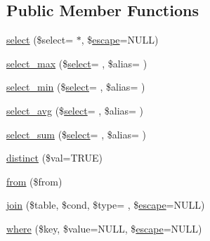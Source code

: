 \subsection*{Public Member Functions}
\begin{DoxyCompactItemize}
\item 
\hyperlink{class_c_i___d_b__query__builder_ac6194faecb10a2731d6e6016f1714531}{select} (\$select= \textquotesingle{}$\ast$\textquotesingle{}, \$\hyperlink{class_c_i___d_b__driver_ac8f37ca5703d4558c732e692194f8cd6}{escape}=N\+U\+L\+L)
\item 
\hyperlink{class_c_i___d_b__query__builder_a3283a75881bf34d98cc13aa5a187c8ac}{select\+\_\+max} (\$\hyperlink{class_c_i___d_b__query__builder_ac6194faecb10a2731d6e6016f1714531}{select}= \textquotesingle{}\textquotesingle{}, \$alias= \textquotesingle{}\textquotesingle{})
\item 
\hyperlink{class_c_i___d_b__query__builder_a460e37c355e9531b238b7c34d5979164}{select\+\_\+min} (\$\hyperlink{class_c_i___d_b__query__builder_ac6194faecb10a2731d6e6016f1714531}{select}= \textquotesingle{}\textquotesingle{}, \$alias= \textquotesingle{}\textquotesingle{})
\item 
\hyperlink{class_c_i___d_b__query__builder_a7c1b8ed90462898bd0d4e95ac3ba1539}{select\+\_\+avg} (\$\hyperlink{class_c_i___d_b__query__builder_ac6194faecb10a2731d6e6016f1714531}{select}= \textquotesingle{}\textquotesingle{}, \$alias= \textquotesingle{}\textquotesingle{})
\item 
\hyperlink{class_c_i___d_b__query__builder_aeb58275ab60ed426ce60ead616477e82}{select\+\_\+sum} (\$\hyperlink{class_c_i___d_b__query__builder_ac6194faecb10a2731d6e6016f1714531}{select}= \textquotesingle{}\textquotesingle{}, \$alias= \textquotesingle{}\textquotesingle{})
\item 
\hyperlink{class_c_i___d_b__query__builder_a65b172f03eea17b7fa243f5732a592bd}{distinct} (\$val=T\+R\+U\+E)
\item 
\hyperlink{class_c_i___d_b__query__builder_a91f5f004ed8e2237a4decc5d23ac3457}{from} (\$from)
\item 
\hyperlink{class_c_i___d_b__query__builder_ac52e03e702734b072159a6007d1793d0}{join} (\$table, \$cond, \$type= \textquotesingle{}\textquotesingle{}, \$\hyperlink{class_c_i___d_b__driver_ac8f37ca5703d4558c732e692194f8cd6}{escape}=N\+U\+L\+L)
\item 
\hyperlink{class_c_i___d_b__query__builder_a2356c4b7b93fb83c62a354a8a0748222}{where} (\$key, \$value=N\+U\+L\+L, \$\hyperlink{class_c_i___d_b__driver_ac8f37ca5703d4558c732e692194f8cd6}{escape}=N\+U\+L\+L)

\end{DoxyCompactItemize}
